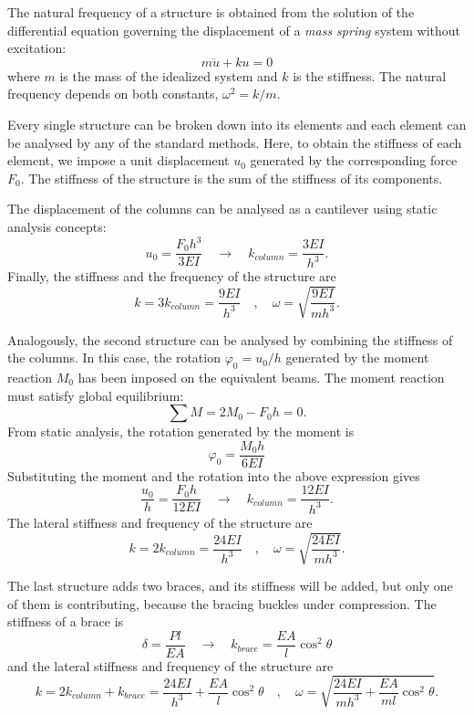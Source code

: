 \begin{Answer}[ref={frames_frequency}]
The natural frequency of a structure is obtained from the solution of the differential equation governing the displacement of a \emph{mass spring} system without excitation:
$$
m\ddot{u}+ku=0
$$
where $m$ is the mass of the idealized system and $k$ is the stiffness. The natural frequency depends on both constants, $\omega^2 = k/m$.

Every single structure can be broken down into its elements and each element can be analysed by any of the standard methods. Here, to obtain the stiffness of each element, we impose a unit displacement $u_0$ generated by the corresponding force $F_0$. The stiffness of the structure is the sum of the stiffness of its components.

\begin{center}
\end{center}

The displacement of the columns can be analysed as a cantilever using static analysis concepts:
$$
u_0 = \frac{F_0h^3}{3EI} \quad \rightarrow \quad k_{column} = \frac{3EI}{h^3}.
$$
Finally, the stiffness and the frequency of the structure are
$$
k = 3k_{column} = \frac{9EI}{h^3} \quad , \quad \omega = \sqrt{\frac{9EI}{mh^3}}.
$$

\begin{center}
\end{center}

Analogously, the second structure can be analysed by combining the stiffness of the columns. In this case, the rotation $\varphi_0 = u_0/h$ generated by the moment reaction $M_0$ has been imposed on the equivalent beams. The moment reaction must satisfy global equilibrium:
$$
\sum M = 2M_0 -F_0h = 0.
$$
From static analysis, the rotation generated by the moment is
$$
\varphi_0 = \frac{M_0h}{6EI}
$$
Substituting the moment and the rotation into the above expression gives
$$
\frac{u_0}{h} = \frac{F_0h}{12EI} \quad \rightarrow \quad k_{column} = \frac{12EI}{h^3}.
$$
The lateral stiffness and frequency of the structure are
$$
k = 2k_{column} = \frac{24EI}{h^3} \quad , \quad \omega = \sqrt{\frac{24EI}{mh^3}}.
$$

\begin{center}
\end{center}

The last structure adds two braces, and its stiffness will be added, but only one of them is contributing, because the bracing buckles under compression. The stiffness of a brace is
$$
\delta = \frac{Pl}{EA} \quad \rightarrow \quad k_{brace} = \frac{EA}{l}\cos^2\theta
$$
and the lateral stiffness and frequency of the structure are
$$
k = 2k_{column} + k_{brace} = \frac{24EI}{h^3}+\frac{EA}{l}\cos^2\theta \quad , \quad 
\omega = \sqrt{\frac{24EI}{mh^3}+\frac{EA}{ml}\cos^2\theta}.
$$
\end{Answer}
